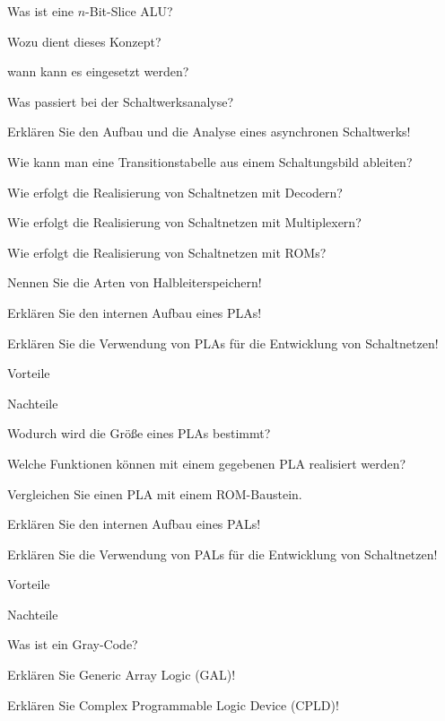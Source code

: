 \documentclass
[
  draft    = true,
  fontsize = 11pt,
  parskip  = half-,
  BCOR     = 0pt,
  DIV      = 11,
  ngerman,
  dvipsnames
]
{scrartcl}
\begin{document}
\begin{mytemize}
  \item Was ist eine $n$-Bit-Slice ALU?
        \begin{mytemize}
          \item Wozu dient dieses Konzept?
          \item wann kann es eingesetzt werden?
        \end{mytemize}
  \item Was passiert bei der Schaltwerksanalyse?
  \item Erklären Sie den Aufbau und die Analyse eines asynchronen Schaltwerks!
  \item Wie kann man eine Transitionstabelle aus einem Schaltungsbild ableiten?
  \item Wie erfolgt die Realisierung von Schaltnetzen mit Decodern?
  \item Wie erfolgt die Realisierung von Schaltnetzen mit Multiplexern?
  \item Wie erfolgt die Realisierung von Schaltnetzen mit ROMs?
  \item Nennen Sie die Arten von Halbleiterspeichern!
  \item Erklären Sie den internen Aufbau eines PLAs!
  \item Erklären Sie die Verwendung von PLAs für die Entwicklung von Schaltnetzen!
        \begin{mytemize}
          \item Vorteile
          \item Nachteile
        \end{mytemize}
  \item Wodurch wird die Größe eines PLAs bestimmt?
  \item Welche Funktionen können mit einem gegebenen PLA realisiert werden?
  \item Vergleichen Sie einen PLA mit einem ROM-Baustein.
  \item Erklären Sie den internen Aufbau eines PALs!
  \item Erklären Sie die Verwendung von PALs für die Entwicklung von Schaltnetzen!
        \begin{mytemize}
          \item Vorteile
          \item Nachteile
        \end{mytemize}
  \item Was ist ein Gray-Code?
  \item Erklären Sie Generic Array Logic (GAL)!
  \item Erklären Sie Complex Programmable Logic Device (CPLD)!

\end{mytemize}
\end{document}
